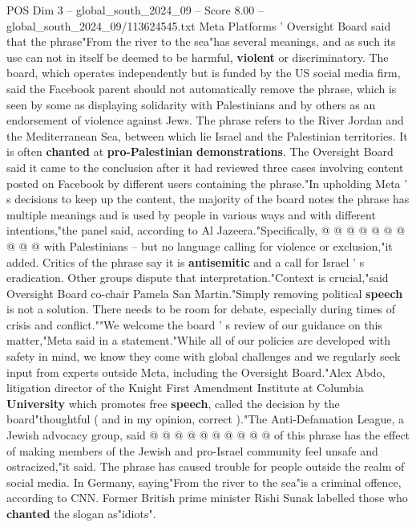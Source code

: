 \begin{textsample}{POS Dim 3 – global\_south\_2024\_09 – Score 8.00 – global\_south\_2024\_09/113624545.txt}  \label{ex:f3_pos_335}
Meta Platforms ' Oversight Board said that the phrase"From the river to the sea"has several meanings, and as such its use can not in itself be deemed to be harmful, \textbf{violent} or discriminatory.
The board, which operates independently but is funded by the US social media firm, said the Facebook parent should not automatically remove the phrase, which is seen by some as displaying solidarity with Palestinians and by others as an endorsement of violence against Jews.
The phrase refers to the River Jordan and the Mediterranean Sea, between which lie Israel and the Palestinian territories.
It is often \textbf{chanted} at \textbf{pro-Palestinian} \textbf{demonstrations}.
The Oversight Board said it came to the conclusion after it had reviewed three cases involving content posted on Facebook by different users containing the phrase."In upholding Meta ' s decisions to keep up the content, the majority of the board notes the phrase has multiple meanings and is used by people in various ways and with different intentions,"the panel said, according to Al Jazeera."Specifically, @ @ @ @ @ @ @ @ @ @ with Palestinians -- but no language calling for violence or exclusion,"it added.
Critics of the phrase say it is \textbf{antisemitic} and a call for Israel ' s eradication.
Other groups dispute that interpretation."Context is crucial,"said Oversight Board co-chair Pamela San Martin."Simply removing political \textbf{speech} is not a solution.
There needs to be room for debate, especially during times of crisis and conflict.""We welcome the board ' s review of our guidance on this matter,"Meta said in a statement."While all of our policies are developed with safety in mind, we know they come with global challenges and we regularly seek input from experts outside Meta, including the Oversight Board."Alex Abdo, litigation director of the Knight First Amendment Institute at Columbia \textbf{University} which promotes free \textbf{speech}, called the decision by the board"thoughtful ( and in my opinion, correct )."The Anti-Defamation League, a Jewish advocacy group, said @ @ @ @ @ @ @ @ @ @ of this phrase has the effect of making members of the Jewish and pro-Israel community feel unsafe and ostracized,"it said.
The phrase has caused trouble for people outside the realm of social media.
In Germany, saying"From the river to the sea"is a criminal offence, according to CNN.
Former British prime minister Rishi Sunak labelled those who \textbf{chanted} the slogan as"idiots".

\end{textsample}
